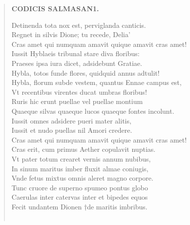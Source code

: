 \documentclass[11pt, a4paper]{report}
\begin{document}
\begin{verse}
    \begin{center} \textbf{CODICIS SALMASAN1.} \end{center} \marginpar{[173]} Detinenda tota nox est, perviglanda canticis. \\ Regnet in silvis Dione; tu recede, Delia’ \\ Cras amet qui numquam amavit quique amavit cras amet! \\ Iussit Hyblaeis tribunal stare diva floribus: \\ Praeses ipsa iura dicet, adsidebunt Gratiae. \\ Hybla, totos funde flores, quidquid annus adtulit! \\ Hybla, florum subde vestem, quantus Ennae campus est, \\ Vt recentibus virentes ducat umbras floribus! \\ Ruris hic erunt puellae vel puellae montium \\ Quaeque silvas quaeque lucos quaeque fontes incolunt. \\ Iussit omnes adsidere pueri mater alitis, \\ Iussit et nudo puellas nil Amori credere. \\ Cras amet qui numquam amavit quique amavit cras amet! \\ Cras erit, cum primus Aether copulavit nuptias. \\ Vt pater totum crearet vernis annum nubibus, \\ In sinum maritus imber fluxit almae coniugis, \\ Vnde fetus mixtus omnis aleret magno corpore. \\ Tunc cruore de superno spumeo pontus globo \\ Caerulas inter catervas inter et bipedes equos \\ Fecit undantem Dionen †de maritis imbribus. \\ 
        ﻿\pagebreak 

\end{verse}
\end{document}
